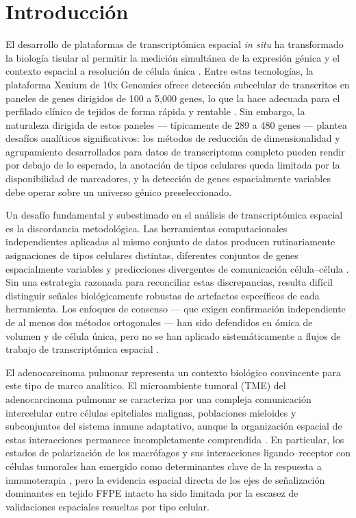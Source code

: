 \documentclass[12pt,a4paper]{article}
\begin{document}
\tableofcontents
\newpage

\section*{Introducción}
\label{sec:intro}
El desarrollo de plataformas de transcriptómica espacial \textit{in situ} ha transformado la biología tisular al permitir la medición simultánea de la expresión génica y el contexto espacial a resolución de célula única \citep{moses2022museum}. Entre estas tecnologías, la plataforma Xenium de 10x Genomics ofrece detección subcelular de transcritos en paneles de genes dirigidos de 100 a 5,000 genes, lo que la hace adecuada para el perfilado clínico de tejidos de forma rápida y rentable \citep{janesick2023high}. Sin embargo, la naturaleza dirigida de estos paneles --- típicamente de 289 a 480 genes --- plantea desafíos analíticos significativos: los métodos de reducción de dimensionalidad y agrupamiento desarrollados para datos de transcriptoma completo pueden rendir por debajo de lo esperado, la anotación de tipos celulares queda limitada por la disponibilidad de marcadores, y la detección de genes espacialmente variables debe operar sobre un universo génico preseleccionado.

Un desafío fundamental y subestimado en el análisis de transcriptómica espacial es la discordancia metodológica. Las herramientas computacionales independientes aplicadas al mismo conjunto de datos producen rutinariamente asignaciones de tipos celulares distintas, diferentes conjuntos de genes espacialmente variables y predicciones divergentes de comunicación célula--célula \citep{dimitrov2022comparison, efremova2020cellphonedb}. Sin una estrategia razonada para reconciliar estas discrepancias, resulta difícil distinguir señales biológicamente robustas de artefactos específicos de cada herramienta. Los enfoques de consenso --- que exigen confirmación independiente de al menos dos métodos ortogonales --- han sido defendidos en ómica de volumen y de célula única, pero no se han aplicado sistemáticamente a flujos de trabajo de transcriptómica espacial \citep{luecken2019current}.

El adenocarcinoma pulmonar representa un contexto biológico convincente para este tipo de marco analítico. El microambiente tumoral (TME) del adenocarcinoma pulmonar se caracteriza por una compleja comunicación intercelular entre células epiteliales malignas, poblaciones mieloides y subconjuntos del sistema inmune adaptativo, aunque la organización espacial de estas interacciones permanece incompletamente comprendida \citep{laughney2020regenerative, wu2021single}. En particular, los estados de polarización de los macrófagos y sus interacciones ligando--receptor con células tumorales han emergido como determinantes clave de la respuesta a inmunoterapia \citep{cassetta2020targeting}, pero la evidencia espacial directa de los ejes de señalización dominantes en tejido FFPE intacto ha sido limitada por la escasez de validaciones espaciales resueltas por tipo celular.
\end{document}
